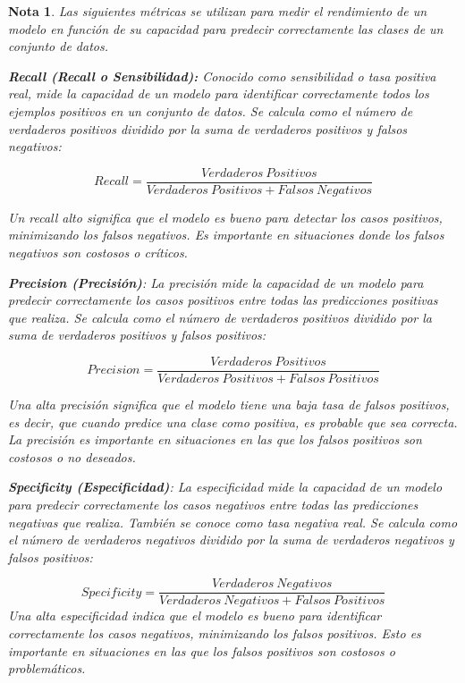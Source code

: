 \documentclass[12pt]{article}
\newtheorem{Note}{Nota}%
\begin{document}
\begin{Note}
Las siguientes métricas se utilizan para medir el rendimiento de un modelo en función de su capacidad para predecir correctamente las clases de un conjunto de datos. \medskip

\textbf{Recall (Recall o Sensibilidad):} Conocido como sensibilidad o tasa positiva real, mide la capacidad de un modelo para identificar correctamente todos los ejemplos positivos en un conjunto de datos. Se calcula como el número de verdaderos positivos dividido por la suma de verdaderos positivos y falsos negativos:

\begin{equation}
Recall = \frac{Verdaderos\ Positivos}{Verdaderos\ Positivos + Falsos\ Negativos}
\end{equation}

Un recall alto significa que el modelo es bueno para detectar los casos positivos, minimizando los falsos negativos. Es importante en situaciones donde los falsos negativos son costosos o críticos.\medskip

\textbf{Precision (Precisión)}: La precisión mide la capacidad de un modelo para predecir correctamente los casos positivos entre todas las predicciones positivas que realiza. Se calcula como el número de verdaderos positivos dividido por la suma de verdaderos positivos y falsos positivos:

\begin{equation}
Precision = \frac{Verdaderos\ Positivos}{Verdaderos\ Positivos + Falsos\ Positivos}
\end{equation}

Una alta precisión significa que el modelo tiene una baja tasa de falsos positivos, es decir, que cuando predice una clase como positiva, es probable que sea correcta. La precisión es importante en situaciones en las que los falsos positivos son costosos o no deseados.\medskip

\textbf{Specificity (Especificidad)}: La especificidad mide la capacidad de un modelo para predecir correctamente los casos negativos entre todas las predicciones negativas que realiza. También se conoce como tasa negativa real. Se calcula como el número de verdaderos negativos dividido por la suma de verdaderos negativos y falsos positivos:

\begin{equation}
Specificity=\frac{Verdaderos\ Negativos}{Verdaderos\ Negativos+Falsos\ Positivos}\end{equation}
Una alta especificidad indica que el modelo es bueno para identificar correctamente los casos negativos, minimizando los falsos positivos. Esto es importante en situaciones en las que los falsos positivos son costosos o problem\'aticos.


\end{Note}
\end{document}
